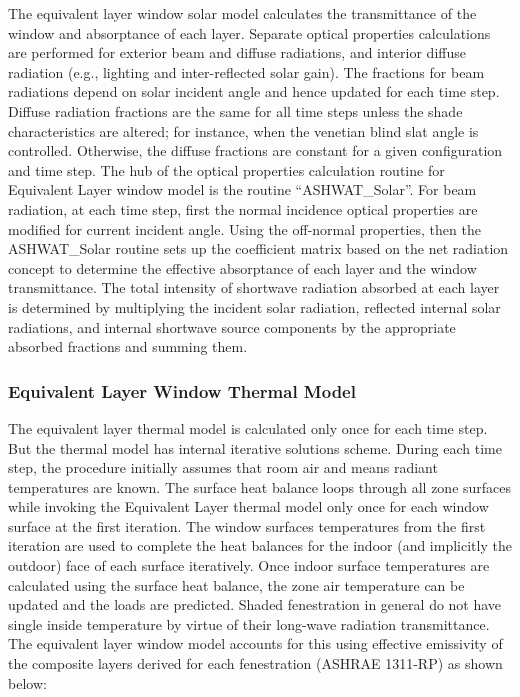 {The equivalent layer window solar model calculates the transmittance of the window and absorptance of each layer. Separate optical properties calculations are performed for exterior beam and diffuse radiations, and interior diffuse radiation (e.g., lighting and inter-reflected solar gain). The fractions for beam radiations depend on solar incident angle and hence updated for each time step. Diffuse radiation fractions are the same for all time steps unless the shade characteristics are altered; for instance, when the venetian blind slat angle is controlled. Otherwise, the diffuse fractions are constant for a given configuration and time step. The hub of the optical properties calculation routine for Equivalent Layer window model is the routine ``ASHWAT\_Solar''. For beam radiation, at each time step, first the normal incidence optical properties are modified for current incident angle. Using the off-normal properties, then the ASHWAT\_Solar routine sets up the coefficient matrix based on the net radiation concept to determine the effective absorptance of each layer and the window transmittance. The total intensity of shortwave radiation absorbed at each layer is determined by multiplying the incident solar radiation, reflected internal solar radiations, and internal shortwave source components by the appropriate absorbed fractions and summing them.

\subsubsection{Equivalent Layer Window Thermal Model}\label{equivalent-layer-window-thermal-model}

The equivalent layer thermal model is calculated only once for each time step. But the thermal model has internal iterative solutions scheme. During each time step, the procedure initially assumes that room air and means radiant temperatures are known. The surface heat balance loops through all zone surfaces while invoking the Equivalent Layer thermal model only once for each window surface at the first iteration. The window surfaces temperatures from the first iteration are used to complete the heat balances for the indoor (and implicitly the outdoor) face of each surface iteratively. Once indoor surface temperatures are calculated using the surface heat balance, the zone air temperature can be updated and the loads are predicted. Shaded fenestration in general do not have single inside temperature by virtue of their long-wave radiation transmittance. The equivalent layer window model accounts for this using effective emissivity of the composite layers derived for each fenestration (ASHRAE 1311-RP) as shown below:

}
